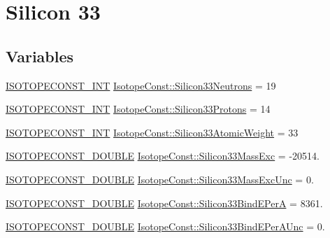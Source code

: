 \hypertarget{group___isotope_const-_silicon-_si33}{}\section{Silicon 33}
\label{group___isotope_const-_silicon-_si33}
\subsection*{Variables}
\begin{DoxyCompactItemize}
\item 
\mbox{\hyperlink{group___isotope_const-_macros_ga5f18360b3e99483a35c32d789e62621c}{I\+S\+O\+T\+O\+P\+E\+C\+O\+N\+S\+T\+\_\+\+I\+NT}} \mbox{\hyperlink{group___isotope_const-_silicon-_si33_ga2e7a291bcc0019201f35ef646ea1e7c3}{Isotope\+Const\+::\+Silicon33\+Neutrons}} = 19
\item 
\mbox{\hyperlink{group___isotope_const-_macros_ga5f18360b3e99483a35c32d789e62621c}{I\+S\+O\+T\+O\+P\+E\+C\+O\+N\+S\+T\+\_\+\+I\+NT}} \mbox{\hyperlink{group___isotope_const-_silicon-_si33_ga2e9cc4eeeb9729c68bce8f634eb86fcf}{Isotope\+Const\+::\+Silicon33\+Protons}} = 14
\item 
\mbox{\hyperlink{group___isotope_const-_macros_ga5f18360b3e99483a35c32d789e62621c}{I\+S\+O\+T\+O\+P\+E\+C\+O\+N\+S\+T\+\_\+\+I\+NT}} \mbox{\hyperlink{group___isotope_const-_silicon-_si33_ga4ce75e82e3fc8169506854950b432339}{Isotope\+Const\+::\+Silicon33\+Atomic\+Weight}} = 33
\item 
\mbox{\hyperlink{group___isotope_const-_macros_ga8f45a7272ce02c0b4c65c44636ed719a}{I\+S\+O\+T\+O\+P\+E\+C\+O\+N\+S\+T\+\_\+\+D\+O\+U\+B\+LE}} \mbox{\hyperlink{group___isotope_const-_silicon-_si33_ga7782433d1118fc9c241efdc60ffedc9a}{Isotope\+Const\+::\+Silicon33\+Mass\+Exc}} = -\/20514.
\item 
\mbox{\hyperlink{group___isotope_const-_macros_ga8f45a7272ce02c0b4c65c44636ed719a}{I\+S\+O\+T\+O\+P\+E\+C\+O\+N\+S\+T\+\_\+\+D\+O\+U\+B\+LE}} \mbox{\hyperlink{group___isotope_const-_silicon-_si33_ga39bcfea7518d5cbe7b3ad2c4f33ecada}{Isotope\+Const\+::\+Silicon33\+Mass\+Exc\+Unc}} = 0.
\item 
\mbox{\hyperlink{group___isotope_const-_macros_ga8f45a7272ce02c0b4c65c44636ed719a}{I\+S\+O\+T\+O\+P\+E\+C\+O\+N\+S\+T\+\_\+\+D\+O\+U\+B\+LE}} \mbox{\hyperlink{group___isotope_const-_silicon-_si33_ga54df6bb6217d38a57cba63a14b4a23e6}{Isotope\+Const\+::\+Silicon33\+Bind\+E\+PerA}} = 8361.
\item 
\mbox{\hyperlink{group___isotope_const-_macros_ga8f45a7272ce02c0b4c65c44636ed719a}{I\+S\+O\+T\+O\+P\+E\+C\+O\+N\+S\+T\+\_\+\+D\+O\+U\+B\+LE}} \mbox{\hyperlink{group___isotope_const-_silicon-_si33_gac334a5d88a07271a827602fcf3ec274d}{Isotope\+Const\+::\+Silicon33\+Bind\+E\+Per\+A\+Unc}} = 0.

\end{DoxyCompactItemize}
